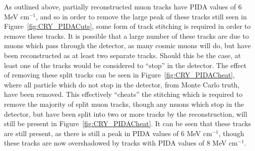 As outlined above, partially reconstructed muon tracks have PIDA values of 6 MeV cm$^{-1}$, and so in order to remove the large peak of these tracks still seen in Figure~\ref{fig:CRY_PIDACuts}, some form of track stitching is required in order to remove these tracks. It is possible that a large number of these tracks are due to muons which pass through the detector, as many cosmic muons will do, but have been reconstructed as at least two separate tracks. Should this be the case, at least one of the tracks would be considered to ``stop'' in the detector. The effect of removing these split tracks can be seen in Figure~\ref{fig:CRY_PIDACheat}, where all particle which do not stop in the detector, from Monte Carlo truth, have been removed. This effectively ``cheats'' the stitching which is required to remove the majority of split muon tracks, though any muons which stop in the detector, but have been split into two or more tracks by the reconstruction, will still be present in Figure~\ref{fig:CRY_PIDACheat}. It can be seen that these tracks are still present, as there is still a peak in PIDA values of 6 MeV cm$^{-1}$, though these tracks are now overshadowed by tracks with PIDA values of 8 MeV cm$^{-1}$. \\

